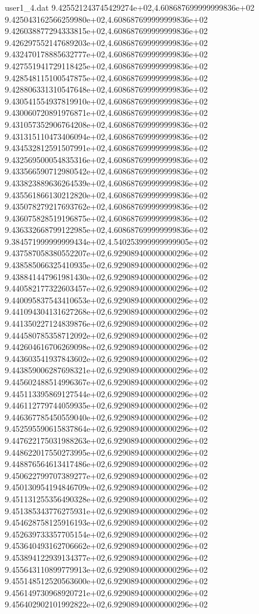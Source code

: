 \begin{filecontents}{user1_4.dat}
9.425521243745429274e+02,4.608687699999999836e+02
9.425043162566259980e+02,4.608687699999999836e+02
9.426038877294333815e+02,4.608687699999999836e+02
9.426297552147689203e+02,4.608687699999999836e+02
9.432470178885632777e+02,4.608687699999999836e+02
9.427551941729118425e+02,4.608687699999999836e+02
9.428548115100547875e+02,4.608687699999999836e+02
9.428806331310547648e+02,4.608687699999999836e+02
9.430541554937819910e+02,4.608687699999999836e+02
9.430060720891976871e+02,4.608687699999999836e+02
9.431057352906764208e+02,4.608687699999999836e+02
9.431315110473406094e+02,4.608687699999999836e+02
9.434532812591507991e+02,4.608687699999999836e+02
9.432569500054835316e+02,4.608687699999999836e+02
9.433566590712980542e+02,4.608687699999999836e+02
9.433823889636264539e+02,4.608687699999999836e+02
9.435561866130212820e+02,4.608687699999999836e+02
9.435078279217693762e+02,4.608687699999999836e+02
9.436075828519196875e+02,4.608687699999999836e+02
9.436332668799122985e+02,4.608687699999999836e+02
9.384571999999999434e+02,4.540253999999999905e+02
9.437587058380552207e+02,6.929089400000000296e+02
9.438585066325410935e+02,6.929089400000000296e+02
9.438841447961981430e+02,6.929089400000000296e+02
9.440582177322603457e+02,6.929089400000000296e+02
9.440095837543410653e+02,6.929089400000000296e+02
9.441094304131627268e+02,6.929089400000000296e+02
9.441350227124839876e+02,6.929089400000000296e+02
9.444580785358712092e+02,6.929089400000000296e+02
9.442604616706269098e+02,6.929089400000000296e+02
9.443603541937843602e+02,6.929089400000000296e+02
9.443859006287698321e+02,6.929089400000000296e+02
9.445602488514996367e+02,6.929089400000000296e+02
9.445113395869127544e+02,6.929089400000000296e+02
9.446112779744059935e+02,6.929089400000000296e+02
9.446367785450559040e+02,6.929089400000000296e+02
9.452595590615837864e+02,6.929089400000000296e+02
9.447622175031988263e+02,6.929089400000000296e+02
9.448622017550273995e+02,6.929089400000000296e+02
9.448876564613417486e+02,6.929089400000000296e+02
9.450622799707389277e+02,6.929089400000000296e+02
9.450130954194846709e+02,6.929089400000000296e+02
9.451131255356490328e+02,6.929089400000000296e+02
9.451385343776275931e+02,6.929089400000000296e+02
9.454628758125916193e+02,6.929089400000000296e+02
9.452639733357705154e+02,6.929089400000000296e+02
9.453640493162706662e+02,6.929089400000000296e+02
9.453894122939134377e+02,6.929089400000000296e+02
9.455643110899779913e+02,6.929089400000000296e+02
9.455148512520563600e+02,6.929089400000000296e+02
9.456149730968920721e+02,6.929089400000000296e+02
9.456402902101992822e+02,6.929089400000000296e+02

\end{filecontents}
